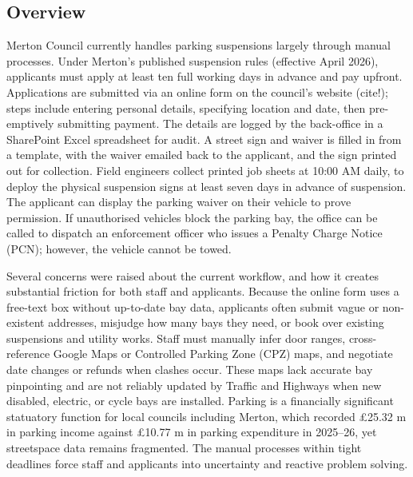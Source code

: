 \subsection{Overview}

Merton Council currently handles parking suspensions largely through manual processes. Under Merton’s published suspension rules (effective April 2026), applicants must apply at least ten full working days in advance and pay upfront. Applications are submitted via an online form on the council's website (cite!); steps include entering personal details, specifying location and date, then pre-emptively submitting payment. The details are logged by the back-office in a SharePoint Excel spreadsheet for audit. A street sign and waiver is filled in from a template, with the waiver emailed back to the applicant, and the sign printed out for collection. Field engineers collect printed job sheets at 10:00 AM daily, to deploy the physical suspension signs at least seven days in advance of suspension. The applicant can display the parking waiver on their vehicle to prove permission. If unauthorised vehicles block the parking bay, the office can be called to dispatch an enforcement officer who issues a Penalty Charge Notice (PCN); however, the vehicle cannot be towed.

Several concerns were raised about the current workflow, and how it creates substantial friction for both staff and applicants. Because the online form uses a free-text box without up-to-date bay data, applicants often submit vague or non-existent addresses, misjudge how many bays they need, or book over existing suspensions and utility works. Staff must manually infer door ranges,  cross-reference Google Maps or Controlled Parking Zone (CPZ) maps, and negotiate date changes or refunds when clashes occur. These maps lack accurate bay pinpointing and are not reliably updated by Traffic and Highways when new disabled, electric, or cycle bays are installed. Parking is a financially significant statuatory function for local councils including Merton, which recorded £25.32 m in parking income against £10.77 m in parking expenditure in 2025–26, yet streetspace data remains fragmented. The manual processes within tight deadlines force staff and applicants into uncertainty and reactive problem solving. 


